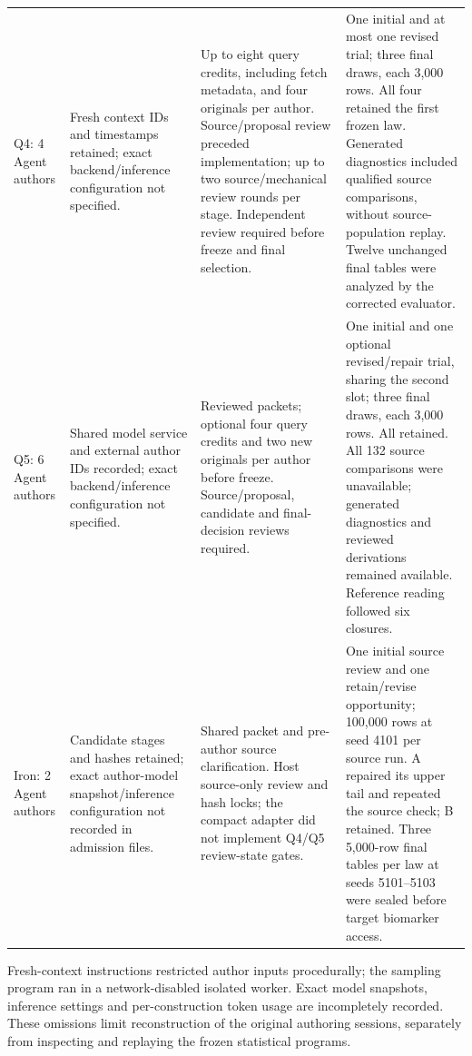 \documentclass[11pt,letterpaper]{article}
\begin{document}
\begin{xltabular}{\linewidth}{@{}>{\raggedright\arraybackslash}X>{\raggedright\arraybackslash}X>{\raggedright\arraybackslash}X>{\raggedright\arraybackslash}X@{}}
Q4: 4 Agent authors & Fresh context IDs and timestamps retained; exact backend/\allowbreak{}inference configuration not specified. & Up to eight query credits, including fetch metadata, and four originals per author. Source/\allowbreak{}proposal review preceded implementation; up to two source/\allowbreak{}mechanical review rounds per stage. Independent review required before freeze and final selection. & One initial and at most one revised trial; three final draws, each 3,000 rows. All four retained the first frozen law. Generated diagnostics included qualified source comparisons, without source-population replay. Twelve unchanged final tables were analyzed by the corrected evaluator. \\

Q5: 6 Agent authors & Shared model service and external author IDs recorded; exact backend/\allowbreak{}inference configuration not specified. & Reviewed packets; optional four query credits and two new originals per author before freeze. Source/\allowbreak{}proposal, candidate and final-decision reviews required. & One initial and one optional revised/\allowbreak{}repair trial, sharing the second slot; three final draws, each 3,000 rows. All retained. All 132 source comparisons were unavailable; generated diagnostics and reviewed derivations remained available. Reference reading followed six closures. \\

Iron: 2 Agent authors & Candidate stages and hashes retained; exact author-model snapshot/\allowbreak{}inference configuration not recorded in admission files. & Shared packet and pre-author source clarification. Host source-only review and hash locks; the compact adapter did not implement Q4/\allowbreak{}Q5 review-state gates. & One initial source review and one retain/\allowbreak{}revise opportunity; 100,000 rows at seed 4101 per source run. A repaired its upper tail and repeated the source check; B retained. Three 5,000-row final tables per law at seeds 5101–\allowbreak{}5103 were sealed before target biomarker access. \\

\end{xltabular}

\endgroup

Fresh-context instructions restricted author inputs procedurally; the sampling program ran in a network-disabled isolated worker. Exact model snapshots, inference settings and per-construction token usage are incompletely recorded. These omissions limit reconstruction of the original authoring sessions, separately from inspecting and replaying the frozen statistical programs.
\end{document}
